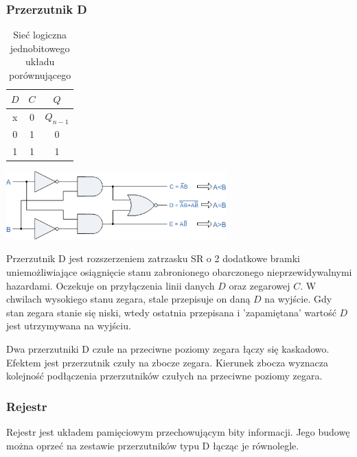 \documentclass[a4paper,12pt]{article}
\begin{document}
\subsubsection{Przerzutnik D}

\begin{table}[h!]
\centering

\begin{minipage}{6.5cm}
\centering

\begin{tabular}{ | c | c || c | }
  \hline
  $D$ & $C$ & $Q$ \\ \hline
  x & 0 & $Q_{n-1}$ \\
  0 & 1 & 0 \\
  1 & 1 & 1 \\
  \hline
\end{tabular}
\end{minipage}
\begin{minipage}{10cm}
   \includegraphics[width=8.5cm]{grafika/obwody/cmp.png}
   \caption*{Sieć logiczna jednobitowego układu porównującego}
\end{minipage}
\end{table}

Przerzutnik D jest rozszerzeniem zatrzasku SR o 2 dodatkowe bramki uniemożliwiające osiągnięcie stanu zabronionego obarczonego nieprzewidywalnymi hazardami. Oczekuje on przyłączenia linii danych $D$ oraz zegarowej $C$. W chwilach wysokiego stanu zegara, stale przepisuje on daną $D$ na wyjście. Gdy stan zegara stanie się niski, wtedy ostatnia przepisana i 'zapamiętana' wartość $D$ jest utrzymywana na wyjściu.


Dwa przerzutniki D czułe na przeciwne poziomy zegara łączy się kaskadowo. Efektem jest przerzutnik czuły na zbocze zegara. Kierunek zbocza wyznacza kolejność podłączenia przerzutników czułych na przeciwne poziomy zegara.

\subsubsection{Rejestr}

Rejestr jest układem pamięciowym przechowującym bity informacji. Jego budowę można oprzeć na zestawie przerzutników typu D łącząc je równolegle.
\end{document}
